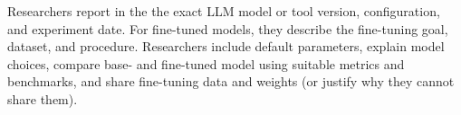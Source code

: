 Researchers \must report in the \paper the exact LLM model or tool version, configuration, and experiment date. For fine-tuned models, they \must describe the fine-tuning goal, dataset, and procedure. Researchers \should include default parameters, explain model choices, compare base- and fine-tuned model using suitable metrics and benchmarks, and share fine-tuning data and weights (or justify why they cannot share them).